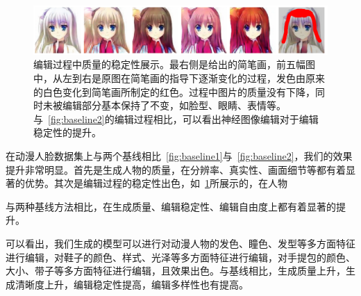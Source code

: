 \documentclass[a4paper,12pt,UTF8]{ctexart}
\newcommand{\kai}{\CJKfamily{zhkai}}	%
\begin{document}
\begin{figure}[H]
  \centering
  \includegraphics[width=1\linewidth]{figs/pic6.png}
  \caption{\kai 编辑过程中质量的稳定性展示。最右侧是给出的简笔画，前五幅图中，从左到右是原图在简笔画的指导下逐渐变化的过程，发色由原来的白色变化到简笔画所制定的红色。过程中图片的质量没有下降，同时未被编辑部分基本保持了不变，如脸型、眼睛、表情等。与~\ref{fig:baseline2}的编辑过程相比，可以看出神经图像编辑对于编辑稳定性的提升。}
  \label{fig:pic6}
\end{figure}

在动漫人脸数据集上与两个基线相比~\ref{fig:baseline1}与~\ref{fig:baseline2}，我们的效果提升非常明显。首先是生成人物的质量，在分辨率、真实性、画面细节等都有着显著的优势。其次是编辑过程的稳定性出色，如~\ref{fig:pic6}所展示的，在人物






与两种基线方法相比，在生成质量、编辑稳定性、编辑自由度上都有着显著的提升。


可以看出，我们生成的模型可以进行对动漫人物的发色、瞳色、发型等多方面特征进行编辑，对鞋子的颜色、样式、光泽等多方面特征进行编辑，对手提包的颜色、大小、带子等多方面特征进行编辑，且效果出色。与基线相比，生成质量上升，生成清晰度上升，编辑稳定性提高，编辑多样性也有提高。
\end{document}
